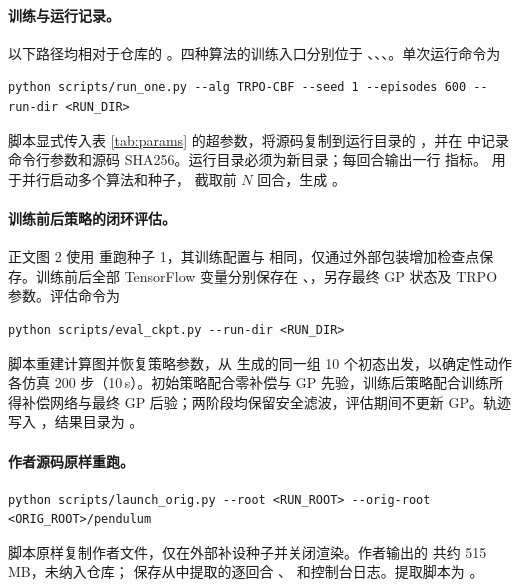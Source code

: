 \documentclass[UTF8,a4paper,zihao=-4,fontset=fandol]{ctexart}
\begin{document}
\paragraph{训练与运行记录。}
以下路径均相对于仓库的 。四种算法的训练入口分别位于 、、、。单次运行命令为
\begin{lstlisting}[language={},numbers=none,frame=none,breakatwhitespace=true,aboveskip=5pt,belowskip=7pt]
python scripts/run_one.py --alg TRPO-CBF --seed 1 --episodes 600 --run-dir <RUN_DIR>
\end{lstlisting}
脚本显式传入表 \ref{tab:params} 的超参数，将源码复制到运行目录的 ，并在  中记录命令行参数和源码 SHA256。运行目录必须为新目录；每回合输出一行  指标。 用于并行启动多个算法和种子， 截取前 $N$ 回合，生成 。

\paragraph{训练前后策略的闭环评估。}
正文图 2 使用  重跑种子 1，其训练配置与  相同，仅通过外部包装增加检查点保存。训练前后全部 TensorFlow 变量分别保存在 、，另存最终 GP 状态及 TRPO 参数。评估命令为
\begin{lstlisting}[language={},numbers=none,frame=none,breakatwhitespace=true,aboveskip=5pt,belowskip=7pt]
python scripts/eval_ckpt.py --run-dir <RUN_DIR>
\end{lstlisting}
脚本重建计算图并恢复策略参数，从  生成的同一组 10 个初态出发，以确定性动作各仿真 200 步（10\,s）。初始策略配合零补偿与 GP 先验，训练后策略配合训练所得补偿网络与最终 GP 后验；两阶段均保留安全滤波，评估期间不更新 GP。轨迹写入 ，结果目录为 。

\paragraph{作者源码原样重跑。}
\begin{lstlisting}[language={},numbers=none,frame=none,breakatwhitespace=true,aboveskip=5pt,belowskip=7pt]
python scripts/launch_orig.py --root <RUN_ROOT> --orig-root <ORIG_ROOT>/pendulum
\end{lstlisting}
脚本原样复制作者文件，仅在外部补设种子并关闭渲染。作者输出的  共约 515\,MB，未纳入仓库； 保存从中提取的逐回合 、 和控制台日志。提取脚本为 。
\end{document}
